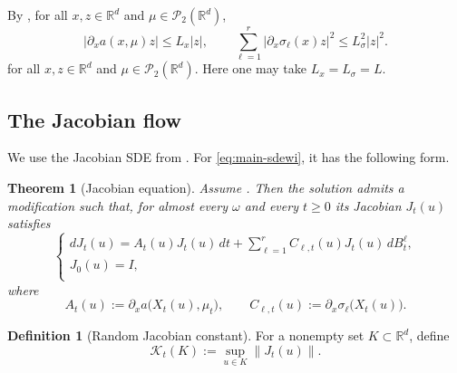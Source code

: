 \documentclass{tsp-short}
\newtheorem{theorem}{Theorem}[section]
\theoremstyle{remark}
\theoremstyle{definition}
\newtheorem{definition}{Definition}[section]
\newcommand{\R}{\mathbb{R}} %
\newcommand{\cP}{\mathcal{P}} %
\begin{document}
By , for all
\(x,z\in\R^d\) and \(\mu\in\cP_2(\R^d)\),
\begin{equation}\label{eq:basic-derivative-bounds}
	|\partial_x a(x,\mu)z| \le L_x|z|, \qquad \sum_{\ell=1}^{r} |\partial_x\sigma_\ell(x)z|^2 \le L_\sigma^2|z|^2.
\end{equation}
for all \(x,z\in\R^d\) and \(\mu\in\cP_2(\R^d)\). Here one may take \(L_x=L_\sigma=L\).

\subsection{The Jacobian flow}\label{subsec:jacobian-flow-distortion-constants}

We use the Jacobian SDE from \cite{dorogovtsev_weiss2023}. For \eqref{eq:main-sdewi}, it has the following form.

\begin{theorem}[Jacobian equation] \label{thm:jacobian-sde}
	Assume . Then the solution admits a
	modification such that, for almost every \(\omega\) and every \(t\ge0\)
	its Jacobian \( J_t(u) \) satisfies
	\begin{equation*}
		\begin{cases}
			dJ_t(u) = A_t(u)J_t(u)\,dt + \sum_{\ell=1}^{r} C_{\ell,t}(u)J_t(u)\,dB_t^\ell, \\
			J_0(u)=I,                                                                      \\
		\end{cases}
	\end{equation*}
	where
	\begin{equation*}
		A_t(u):=\partial_x a\bigl(X_t(u),\mu_t\bigr), \qquad C_{\ell,t}(u):=\partial_x\sigma_\ell\bigl(X_t(u)\bigr).
	\end{equation*}
\end{theorem}

\begin{definition}[Random Jacobian constant]\label{def:jacobian-constant}
	For a nonempty set \(K\subset\R^d\), define
	\begin{equation*}
		\mathcal K_t(K):=\sup_{u\in K}\|J_t(u)\|.
	\end{equation*}
\end{definition}
\end{document}
